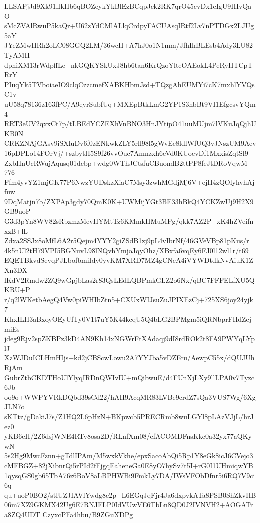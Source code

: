 LLSAPjJd9Xk91lIkHb6qBOZeykYkBlEzBCqpJck2RK7qrO45cvDx1eIgU9IHvQaO
sMcZVAlRwuP5kaQr+U62zYdCMlALlqCrdpyFACUAsqIRtf2Lv7nPTDGx2LJUg5aY
JYeZMwHRh2oLC08GGQ2LM/36wcH+A7hJ0o1N1mm/JfhIhBLEsb4Ady3LU82TyAMH
dphiXM13rWdpffLe+nkGQKYSkUxJ8hb6tan6KrQzoYlteOAEokL4PeRyHTCpTRrY
PIuqYk5TVboiaeIO9clqCzzcmefXABKHbmJsd+TQzgAhEUMYi7cK7mxhlYVQsC1v
uU58q78136z163fPC/A9eyrSubfUq+MXEpBtkLmG2YP1S3nbBt9VI1EfgcsvYQm4
RRT3eUV2qxxCt7p/tLBEdYCZEXhVnBNO3HnJYtipO41uuMUjm7lVKuJqQjhUKB0N
CRKZNAjGAsv9iSXluDv6f0zENkwkZLY5rll98l5gWvEe8ldlWfUQ3vJNszUM9Aev
16pDPLo14FOrVj/+szbytH5S9f26vvOuc7Amnzxh6eVd0KUoevDf1MxxisZqtSl9
ZxbHnUcRWujAqusq01dcbp+wdg0WThJCtsfuCBuondB2ttPP8feJtDRoVqwM+776
Ffm4yvYZ1mjGK77P6NwzYUDskzXiaC7Msy3zwhMGdjMj6V+ejH4zQOlyhvhAjfuw
9DqMatjn7b/ZXPAp3gdy70QmK0K+UWMijYGt3BE33hBkQ4YCKZwUj9H2X9GB9uoP
G3d3pYn8WV82sRbzmzMevHYMtTz6KMmkHMuMPg/qkk7AZ2P+xK4hZVeifnxzB+lL
Zdxa2SSJx8oMfL6A2r5Qejm4YYY2giZSdB1zj9pL4vIbrNf/46GVeVBp81pKus/r
4k5nUl2tH79VPI5BGNuvL98lNQvhYmjoJqyOhz/XBxfa6vqEy6FJ0l12wl1r/t69
EQETBkvdSevqPJLbofbmiIdy0yvKM7XRD7MZ4gCNeA4iVYWDtdkNvAiuK1ZXn3DX
lKdV2Rmdw2ZQ9wGpjbLas2r83QsLEdLQBPmkGLZ2o6Nx/qBC7FFFELfXU5QKRU+P
r/q2lWKetbAegQ4Vw0piWHIbZtn5+CXUxWIJsuZuJPIXEzCj+725XS6joy24yjk7
KhxILH3aBxoyOEyUfTy0V1t7uY5K44kcqU5Q4bLG2BPMgm5iQRNbprFHdZejmiEs
jdeg9Rjv2spZKBPz3kD4AN9Kh14xNGWrFtXAdaqj9dI8rdROk2t8FA9PWYqLYplJ
XzWJDuICLHmHIjs+kd2jCBScwLowu2A7YYJba5vDZFcu/AewpC55x/dQUJUhRjAm
GubrZtbCKDTHoUlYlyqIRDnQWIvIU+mQibwuE/d4FUnXjLXy9llLPA0v7Tyzc6Jb
oo9o+WWPYVRkDQbd39sCd22/hAH9AcqMR83LVBe9crdZ7sQa3VUS7Wg/6XgJLN7o
sKTtz/gDakiJ7s/Z1HQ2L6pHzN+BKpwcb5PRECRmb8wuLGYl8pLAzVJjL/hrJez0
yKB6eII/2Z6dsjWNE4RTv8osa2D/RLnfXm08/efACOMDFnsKkc0a32yx77aQKywN
5s2Hg9MwcFznn+gTdlIPAm/M5wxkVkhe/epxSacoAbQi5Rp1Y8eGk8icJ6CVejo3
cMFBGZ+82jXibnrQi5rPId2fFjgqEaheneGa0E8yO7hySv7t5I+rG0I1UHmiqwYB
1qysqGS0gb65TbA76z6BoV8aLBPHWBi9FmkLy7DA/IWsVFObDfnr5i6RQ7V9ci6q
qu+uoP0BO2/stlUZJIAVlYwdg8e2p+L6EGqJqFjr4Ja6dxpvkATa8PSB0ShZkvHB
06m7XZ9GKMX42Ug6E7RNJFLP0IdVUwVE6TbLn8QD0J2IVNVH2+AOGATra8ZQ4UDT
CzyxcPFa4hbu/B9ZGuXDPg==
